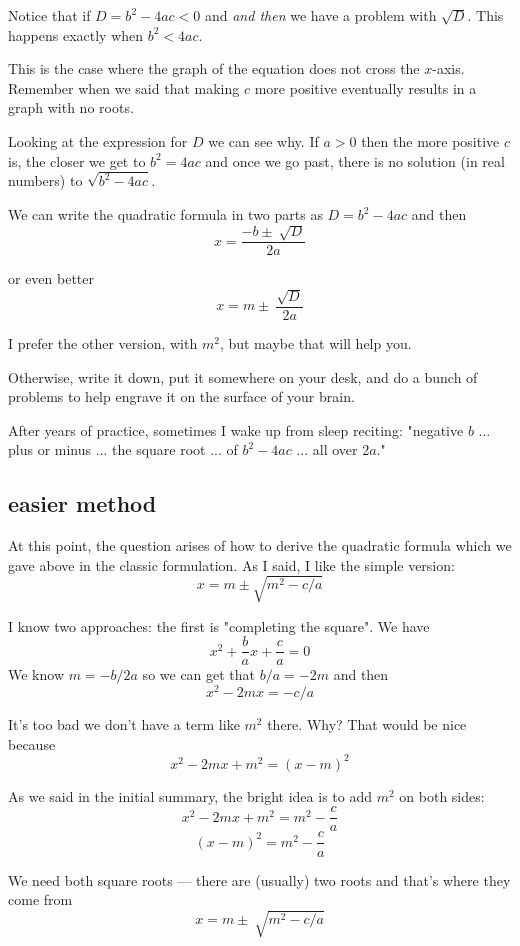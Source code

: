 \documentclass[11pt, oneside]{article}
\begin{document}
Notice that if $D = b^2 - 4ac < 0$ and \emph{and then} we have a problem with $\sqrt{D}$.   This happens exactly when $b^2 < 4ac$. 

This is the case where the graph of the equation does not cross the $x$-axis.  Remember when we said that making $c$ more positive eventually results in a graph with no roots.  

Looking at the expression for $D$ we can see why.  If $a > 0$ then the more positive $c$ is, the closer we get to $b^2 = 4ac$ and once we go past, there is no solution (in real numbers) to $\sqrt{b^2 - 4ac}$.

We can write the quadratic formula in two parts as $D = b^2 - 4ac$ and then
\[ x = \frac{- b \pm \ \sqrt{D}}{2a} \]

or even better
\[ x = m \pm \ \frac{\sqrt{D}}{2a} \]

I prefer the other version, with $m^2$, but maybe that will help you.  

Otherwise, write it down, put it somewhere on your desk, and do a bunch of problems to help engrave it on the surface of your brain.  

After years of practice, sometimes I wake up from sleep reciting: "negative $b$ ...  plus or minus ...  the square root ... of $b^2 - 4ac$ ... all over 2$a$."

\subsection*{easier method}

At this point, the question arises of how to derive the quadratic formula which we gave above in the classic formulation.  As I said, I like the simple version:
\[ x = m \pm \sqrt{m^2 - c/a } \]

I know two approaches:  the first is "completing the square".   We have
\[ x^2 + \frac{b}{a} x + \frac{c}{a} = 0 \]
We know $m = -b/2a$ so we can get that $b/a = -2m$ and then
\[ x^2 - 2mx = - c/a    \]

It's too bad we don't have a term like $m^2$ there.  Why?  That would be nice because
\[ x^2 - 2mx + m^2 = (x - m)^2 \]

As we said in the initial summary, the bright idea is to add $m^2$ on both sides:
\[ x^2 - 2mx + m^2 = m^2 - \frac{c}{a} \]
\[ (x - m)^2= m^2 - \frac{c}{a} \]

We need both square roots --- there are (usually) two roots and that's where they come from
\[ x = m \pm \ \sqrt{m^2 - c/a } \]
\end{document}
